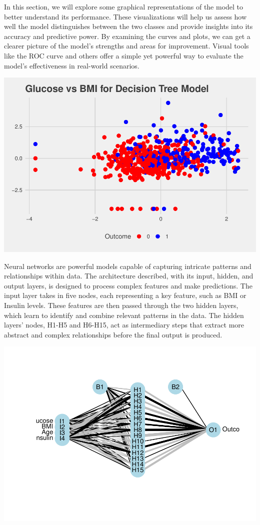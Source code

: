 \documentclass[
]{article}
\begin{document}
In this section, we will explore some graphical representations of the
model to better understand its performance. These visualizations will
help us assess how well the model distinguishes between the two classes
and provide insights into its accuracy and predictive power. By
examining the curves and plots, we can get a clearer picture of the
model's strengths and areas for improvement. Visual tools like the ROC
curve and others offer a simple yet powerful way to evaluate the model's
effectiveness in real-world scenarios.

\begin{center}\includegraphics{Diabetes-Project_files/figure-latex/nn plot 1-1} \end{center}

Neural networks are powerful models capable of capturing intricate
patterns and relationships within data. The architecture described, with
its input, hidden, and output layers, is designed to process complex
features and make predictions. The input layer takes in five nodes, each
representing a key feature, such as BMI or Insulin levels. These
features are then passed through the two hidden layers, which learn to
identify and combine relevant patterns in the data. The hidden layers'
nodes, H1-H5 and H6-H15, act as intermediary steps that extract more
abstract and complex relationships before the final output is produced.

\begin{center}\includegraphics{Diabetes-Project_files/figure-latex/nn plot 2-1} \end{center}
\end{document}
